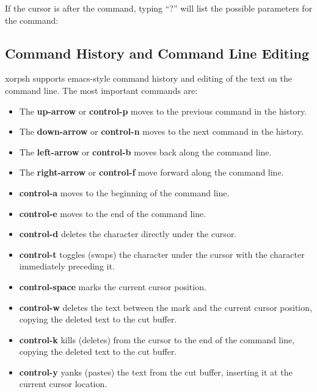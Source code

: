 \documentclass[11pt]{article}
\newcommand{\xorpsh}{{\sf\small xorpsh}\xspace}
\begin{document}
\noindent
If the cursor is after the command, typing ``?'' will list the possible
parameters for the command:
\vspace{0.1in}

\noindent{}

\subsection{Command History and Command Line Editing}

\xorpsh supports emacs-style command history and editing of the text
on the command line.  The most important commands are:
\begin{itemize}
\item The {\bf up-arrow} or {\bf control-p} moves to the previous
command in the history.
\item The {\bf down-arrow} or {\bf control-n} moves to the next
command in the history.
\item The {\bf left-arrow} or {\bf control-b} moves back along the
command line.
\item The {\bf right-arrow} or {\bf control-f} move forward along the
command line.
\item {\bf control-a} moves to the beginning of the command line.
\item {\bf control-e} moves to the end of the command line.
\item {\bf control-d} deletes the character directly under the cursor.
\item {\bf control-t} toggles (swaps) the character under the cursor with
the character immediately preceding it.
\item {\bf control-space} marks the current cursor position.
\item {\bf control-w} deletes the text between the mark and the current
cursor position, copying the deleted text to the cut buffer.
\item {\bf control-k} kills (deletes) from the cursor to the end of the
command line, copying the deleted text to the cut buffer.
\item {\bf control-y} yanks (pastes) the text from the cut buffer,
inserting it at the
current cursor location.
\end{itemize}
\end{document}
